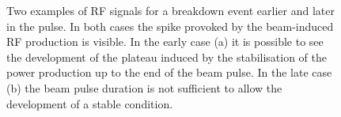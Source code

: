 \begin{figure}[h]
\centering
   \hspace{2mm}
\caption{Two examples of RF signals for a breakdown event earlier and later in the pulse. In both cases the spike provoked by the beam-induced RF production is visible. In the early case (a) it is possible to see the development of the plateau induced by the stabilisation of the power production up to the end of the beam pulse. In the late case (b) the beam pulse duration is not sufficient to allow the development of a stable condition.}
 \label{BI_rf_fig}
 \end{figure}


